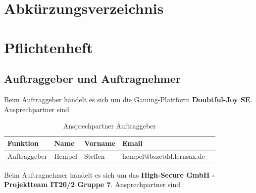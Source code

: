 \documentclass[a4paper,
    11pt,
    headings=small,
    ngerman,
    listof=totoc,
    numbers=noenddot]{scrreprt}[2021/11/13]
\begin{document}
\tableofcontents

\newpage

\chapter*{Abkürzungsverzeichnis}

\begin{acronym}[DHCP]
\end{acronym}

\newpage
\pagestyle{scrheadings}
\ihead{\rightmark}


\chapter{Pflichtenheft}



\section{Auftraggeber und Auftragnehmer }

Beim Auftraggeber handelt es sich um die Gaming-Plattform \textbf{Doubtful-Joy SE}. Ansprechpartner sind

\begin{table}[htbp]
  \centering
  \renewcommand{\arraystretch}{1.25}
  \caption{Ansprechpartner Auftraggeber}
  \begin{tabular}{lllll}
    Funktion     & Name   & Vorname & Email                                 \\
    \hline
    Auftraggeber & Hempel & Steffen & \flq{}hempel@bszetdd.lernsax.de\frq{} \\
  \end{tabular}
  \label{tab:Auftraggeber}
\end{table}

Beim Auftragnehmer handelt es sich um das \textbf{High-Secure GmbH - Projektteam IT20/2 Gruppe 7}. Ansprechpartner sind
\end{document}
